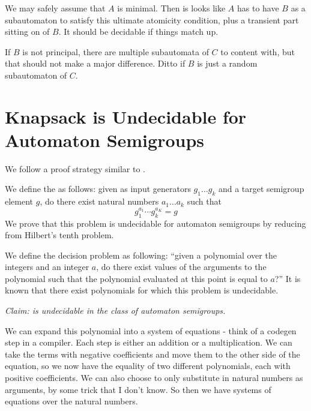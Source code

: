 \documentclass[10pt]{article}
\begin{document}
We may safely assume that $A$ is minimal. Then is looks like $A$ has
to have $B$ as a subautomaton to satisfy this ultimate atomicity
condition, plus a transient part sitting on of $B$. It should be
decidable if things match up.

If $B$ is not principal, there are multiple subautomata of $C$ to
content with, but that should not make a major difference. Ditto if
$B$ is just a random subautomaton of $C$.

%

\section{Knapsack is Undecidable for Automaton Semigroups}
We follow a proof strategy similar to \cite{Konig15:knapsack}.

We define the  as follows: given as input
generators $g_1 \ldots g_k$ and a target semigroup element $g$, do there
exist natural numbers $a_1\ldots a_k$ such that
\[ g_1^{a_1} \cdots g_k^{a_K} = g \] We prove that this problem is
undecidable for automaton semigroups by reducing from %
Hilbert's tenth problem.

We define the decision problem  as following: ``given
a polynomial over the integers and an integer $a$, do there exist
values of the arguments to the polynomial such that the polynomial
evaluated at this point is equal to $a$?'' It is known that there
exist polynomials for which this problem is undecidable.

\textit{Claim:  is undecidable in the class of automaton semigroups.}

We can expand this polynomial into a system of equations - think of a
codegen step in a compiler. Each step is either an addition or a
multiplication. We can take the terms with negative coefficients and
move them to the other side of the equation, so we now have the
equality of two different polynomials, each with positive
coefficients. We can also choose to only substitute in natural numbers
as arguments, by some trick that I don't know. So then we have systems
of equations over the natural numbers.
\end{document}
